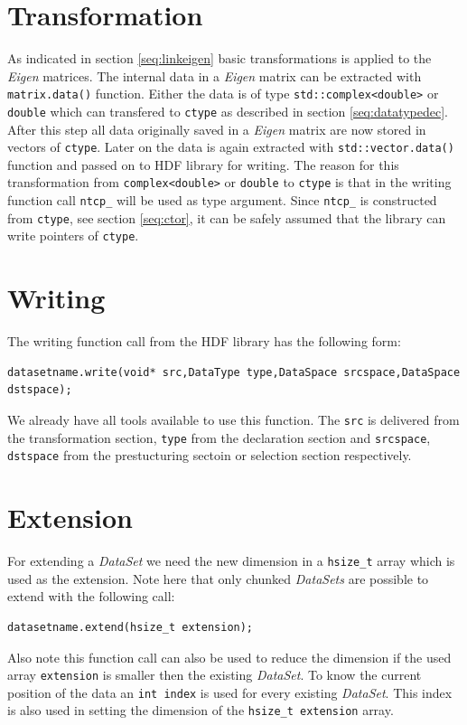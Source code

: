 \section{Transformation}
As indicated in section \ref{seq:linkeigen} basic transformations is applied to the \textit{Eigen} matrices. The internal data in a \textit{Eigen} matrix can be extracted with \texttt{matrix.data()} function. Either the data is of type \texttt{std::complex<double>} or \texttt{double} which can transfered to \texttt{ctype} as described in section \ref{seq:datatypedec}. After this step all data originally saved in a \textit{Eigen} matrix are now stored in vectors of \texttt{ctype}. Later on the data is again extracted with \texttt{std::vector.data()} function and passed on to HDF library for writing. The reason for this transformation from \texttt{complex<double>} or \texttt{double} to \texttt{ctype} is that in the writing function call \texttt{ntcp\_} will be used as type argument. Since \texttt{ntcp\_} is constructed from \texttt{ctype}, see section \ref{seq:ctor}, it can be safely assumed that the library can write pointers of \texttt{ctype}.

\section{Writing} 

The writing function call from the HDF library has the following form:
\begin{lstlisting}
datasetname.write(void* src,DataType type,DataSpace srcspace,DataSpace dstspace);
\end{lstlisting}
We already have all tools available to use this function. The \texttt{src} is delivered from the transformation section, \texttt{type} from the declaration section and \texttt{srcspace}, \texttt{dstspace} from the prestucturing sectoin or selection section respectively.

\section{Extension}
For extending a \textit{DataSet} we need the new dimension in a \texttt{hsize\_t} array which is used as the extension. Note here that only chunked \textit{DataSets} are possible to extend with the following call:
\begin{lstlisting}
datasetname.extend(hsize_t extension);
\end{lstlisting}
Also note this function call can also be used to reduce the dimension if the used array \texttt{extension} is smaller then the existing \textit{DataSet}. To know the current position of the data an \texttt{int index} is used for every existing \textit{DataSet}. This index is also used in setting the dimension of the \texttt{hsize\_t extension} array.


